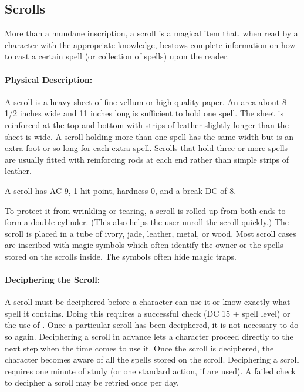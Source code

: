 \subsection{Scrolls}
\label{Item:Scrolls}
More than a mundane inscription, a scroll is a magical item that, when read by a character with the appropriate knowledge, bestows complete information on how to cast a certain spell (or collection of spells) upon the reader.

\paragraph{Physical Description:} A scroll is a heavy sheet of fine vellum or high-quality paper. 
An area about 8 1/2 inches wide and 11 inches long is sufficient to hold one spell. 
The sheet is reinforced at the top and bottom with strips of leather slightly longer than the sheet is wide.  
A scroll holding more than one spell has the same width but is an extra foot or so long for each extra spell. 
Scrolls that hold three or more spells are usually fitted with reinforcing rods at each end rather than simple strips of leather.

A scroll has AC 9, 1 hit point, hardness 0, and a break DC of 8.

To protect it from wrinkling or tearing, a scroll is rolled up from both ends to form a double cylinder. 
(This also helps the user unroll the scroll quickly.)
The scroll is placed in a tube of ivory, jade, leather, metal, or wood.
Most scroll cases are inscribed with magic symbols which often identify the owner or the spells stored on the scrolls inside. 
The symbols often hide magic traps.

\paragraph{Deciphering the Scroll:} 
A scroll must be deciphered before a character can use it or know exactly what spell it contains. 
Doing this requires a successful  check (DC 15 + spell level) or the use of . 
Once a particular scroll has been deciphered, it is not necessary to do so again. 
Deciphering a scroll in advance lets a character proceed directly to the next step when the time comes to use it.
Once the scroll is deciphered, the character becomes aware of all the spells stored on the scroll. 
Deciphering a scroll requires one minute of study (or one standard action, if  are used).
A failed check to decipher a scroll may be retried once per day.

